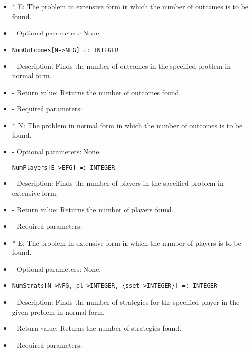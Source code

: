 \begin{itemize}
\bd
\item
*  E:  The problem in extensive form in which the number of outcomes
is to be found.
\ed

\item
- Optional parameters:  None.
\ed

\item
\begin{verbatim}
NumOutcomes[N->NFG] =: INTEGER
\end{verbatim}

\bd
\item
- Description:  Finds the number of outcomes in the specified problem in
normal form.
\item
- Return value:  Returns the number of outcomes found.
\item
- Required parameters:
	
\bd
\item
*  N:  The problem in normal form in which the number of outcomes is
to be found.
\ed

\item
- Optional parameters:  None.
\ed

\begin{verbatim}
NumPlayers[E->EFG] =: INTEGER
\end{verbatim}

\bd
\item
- Description:  Finds the number of players in the specified problem in
extensive form.
\item
- Return value:  Returns the number of players found.
\item
- Required parameters:

\bd
\item*  E:  The problem in extensive form in which the number of players
is to be found.
\ed

\item   
- Optional parameters:  None.
\ed

\item
\begin{verbatim}
NumStrats[N->NFG, pl->INTEGER, {sset->INTEGER}] =: INTEGER
\end{verbatim}

\bd

\item
- Description:  Finds the number of strategies for the specified player 
in the given problem in normal form.
\item
- Return value:  Returns the number of strategies found.
\item
- Required parameters:


\end{itemize}

